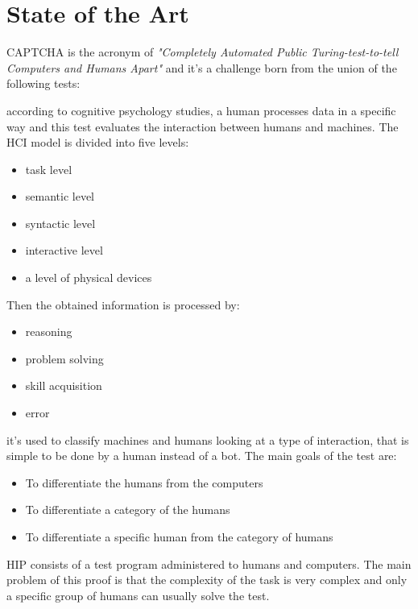 \chapter{State of the Art}\label{chapter:StateOfArt}
CAPTCHA is the acronym of \textit{"Completely Automated Public Turing-test-to-tell Computers and Humans Apart"} and it's a challenge born from the union of the following tests\cite{types_CAPTCHA}:
\begin{enumerate}
{according to cognitive psychology studies, a human processes data in a specific way and this test evaluates the interaction between humans and machines. The HCI model is divided into five levels:
\begin{itemize}
	\item{task level}
	\item{semantic level}
	\item{syntactic level}
	\item{interactive level}
	\item{a level of physical devices}
\end{itemize}   
Then the obtained information is processed by:
\begin{itemize}
	\item{reasoning}
	\item{problem solving}
	\item{skill acquisition}
	\item{error}
\end{itemize}   
}
{it's used to classify machines and humans looking at a type of interaction, that is simple to be done by a human instead of a bot. The main goals of the test are:
\begin{itemize}
	\item{To differentiate the humans from the computers}
	\item{To differentiate a category of the humans}
	\item{To differentiate a specific human from the category of humans}
\end{itemize}
HIP consists of a test program administered to humans and computers. The main problem of this proof is that the complexity of the task is very complex and only a specific group of humans can usually solve the test.}
\end{enumerate}
